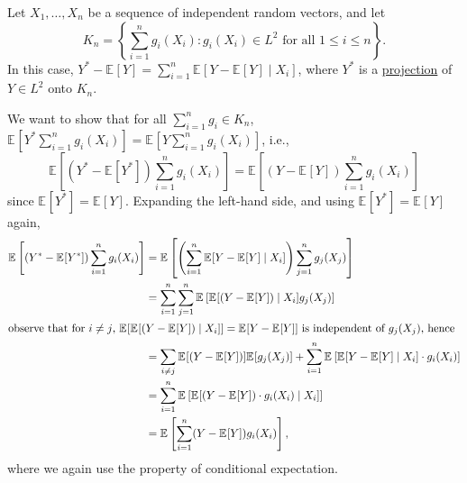 \begin{eg}\label{eg:projection}
	Let \(X_1, \dots , X_n\) be a sequence of independent random vectors, and let
	\[
		K_n = \left\{ \sum_{i=1}^{n} g_i(X_i) \colon g_i(X_i) \in L^2 \text{ for all } 1 \leq i \leq n \right\}.
	\]
	In this case, \(Y^{\ast} - \mathbb{E}_{}[Y] = \sum_{i=1}^{n} \mathbb{E}_{}[Y - \mathbb{E}_{}[Y] \mid X_i] \), where \(Y^{\ast} \) is a \hyperref[def:projection]{projection} of \(Y \in L^2\) onto \(K_n\).
\end{eg}
\begin{explanation}
	We want to show that for all \(\sum_{i=1}^{n} g_i \in K_n\), \(\mathbb{E}_{}[Y^{\ast} \sum_{i=1}^{n} g_i(X_i)] = \mathbb{E}_{}[Y \sum_{i=1}^{n} g_i(X_i)] \), i.e.,
	\[
		\mathbb{E}_{}\left[(Y^{\ast} - \mathbb{E}_{}[Y^{\ast} ] ) \sum_{i=1}^{n} g_i(X_i)\right]
		= \mathbb{E}_{}\left[(Y - \mathbb{E}_{}[Y] ) \sum_{i=1}^{n} g_i(X_i)\right]
	\]
	since \(\mathbb{E}_{}[Y^{\ast} ] = \mathbb{E}_{}[Y] \). Expanding the left-hand side, and using \(\mathbb{E}_{}[Y^{\ast} ] = \mathbb{E}_{}[Y] \) again,
	\begin{align*}
		\mathbb{E}_{}\left[(Y^{\ast} - \mathbb{E}_{}[Y^{\ast} ] ) \sum_{i=1}^{n} g_i(X_i)\right]
		 & = \mathbb{E}_{}\left[\left( \sum_{i=1}^{n} \mathbb{E}_{}[Y - \mathbb{E}_{}[Y] \mid X_i] \right) \sum_{j=1}^{n} g_j(X_j)\right]                                                            \\
		 & = \sum_{i=1}^{n} \sum_{j=1}^{n} \mathbb{E}_{}\left[\mathbb{E}_{}[(Y - \mathbb{E}_{}[Y] ) \mid X_i] g_j(X_j) \right]                                                                       \\
		\shortintertext{observe that for \(i\neq j\), \(\mathbb{E}_{}[\mathbb{E}_{}[(Y - \mathbb{E}_{}[Y] ) \mid X_i ]] = \mathbb{E}_{}[Y - \mathbb{E}_{}[Y] ] \) is independent of \(g_j(X_j)\), hence}
		 & = \sum_{i \neq j} \mathbb{E}_{}[(Y - \mathbb{E}_{}[Y] ) ] \mathbb{E}_{}[g_j(X_j) ] + \sum_{i=1}^{n} \mathbb{E}_{}\left[\mathbb{E}_{}[Y - \mathbb{E}_{}[Y] \mid X_i] \cdot g_i(X_i)\right] \\
		 & =  \sum_{i=1}^{n} \mathbb{E}_{}\left[\mathbb{E}_{}[(Y - \mathbb{E}_{}[Y]) \cdot g_i(X_i) \mid X_i]\right]                                                                                 \\
		 & = \mathbb{E}_{}\left[\sum_{i=1}^{n} (Y - \mathbb{E}_{}[Y] ) g_i(X_i) \right],
	\end{align*}
	where we again use the property of conditional expectation.
\end{explanation}

